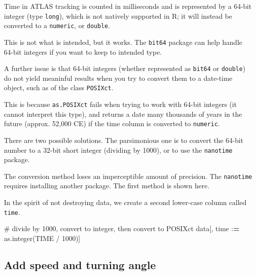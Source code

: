\documentclass[]{scrreprt}
\newenvironment{Shaded}{}{}
\newcommand{\CommentTok}[1]{\textcolor[rgb]{0.00,0.50,0.00}{#1}}
\newcommand{\DecValTok}[1]{#1}
\newcommand{\ErrorTok}[1]{\textcolor[rgb]{1.00,0.00,0.00}{\textbf{#1}}}
\newcommand{\KeywordTok}[1]{\textcolor[rgb]{0.00,0.00,1.00}{#1}}
\newcommand{\NormalTok}[1]{#1}
\newcommand{\OperatorTok}[1]{#1}
\newcommand{\StringTok}[1]{\textcolor[rgb]{0.00,0.50,0.50}{#1}}
\begin{document}
Time in ATLAS tracking is counted in milliseconds and is represented by a 64-bit integer (type \texttt{long}), which is not natively supported in R; it will instead be converted to a \texttt{numeric}, or \texttt{double}.

This is not what is intended, but it works. The \texttt{bit64} package can help handle 64-bit integers if you want to keep to intended type.

A further issue is that 64-bit integers (whether represented as \texttt{bit64} or \texttt{double}) do not yield meaninful results when you try to convert them to a date-time object, such as of the class \texttt{POSIXct}.

This is because \texttt{as.POSIXct} fails when trying to work with 64-bit integers (it cannot interpret this type), and returns a date many thousands of years in the future (approx. 52,000 CE) if the time column is converted to \texttt{numeric}.

There are two possible solutions. The parsimonious one is to convert the 64-bit number to a 32-bit short integer (dividing by 1000), or to use the \texttt{nanotime} package.

The conversion method loses an imperceptible amount of precision. The \texttt{nanotime} requires installing another package. The first method is shown here.

In the spirit of not destroying data, we create a second lower-case column called \texttt{time}.

\begin{Shaded}
\begin{Highlighting}[]
\CommentTok{# divide by 1000, convert to integer, then convert to POSIXct}
\NormalTok{data[, time }\OperatorTok{:}\ErrorTok{=}\StringTok{ }\KeywordTok{as.integer}\NormalTok{(TIME }\OperatorTok{/}\StringTok{ }\DecValTok{1000}\NormalTok{)]}
\end{Highlighting}
\end{Shaded}

\hypertarget{add-speed-and-turning-angle}{%
\subsection{Add speed and turning angle}\label{add-speed-and-turning-angle}}
\end{document}
